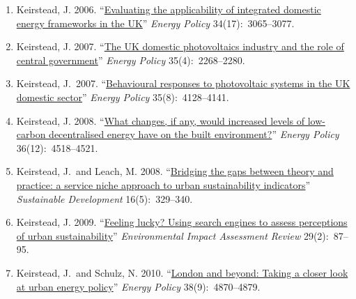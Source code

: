 \documentclass[11pt,a4paper]{article}
\newcommand{\marginhead}[1]{\marginpar{\textsf{{\footnotesize #1}}}}
\newcommand{\flag}{\marginpar{\hfill\raisebox{-2pt}{*}}}
\begin{document}
\bigskip 

\noindent\marginhead{Journal articles}%
%
%  
\mbox{}\vspace{-2em}
\begin{enumerate}

\item Keirstead, J. 2006. ``\href{http://dx.doi.org/10.1016/j.enpol.2005.06.004}{Evaluating the applicability of integrated domestic energy frameworks in the UK}'' \emph{Energy Policy} 34(17):~3065--3077.

\item Keirstead, J. 2007. ``\href{http://dx.doi.org/10.1016/j.enpol.2006.08.003}{The UK domestic photovoltaics industry and the role of central government}'' \emph{Energy Policy} 35(4):~2268--2280.

\item Keirstead, J.\flag\ 2007. ``\href{http://dx.doi.org/10.1016/j.enpol.2007.02.019}{Behavioural responses to photovoltaic systems in the UK domestic sector}'' \emph{Energy Policy} 35(8):~4128--4141.\label{paper:dphil}

\item Keirstead, J. 2008. ``\href{http://dx.doi.org/10.1016/j.enpol.2008.09.019}{What changes, if any, would increased levels of low-carbon decentralised energy have on the built environment?}'' \emph{Energy Policy} 36(12):~4518--4521.

\item Keirstead, J.\  and Leach, M.  2008. ``\href{http://dx.doi.org/10.1002/sd.349}{Bridging the gaps between theory and practice: a service niche approach to urban sustainability indicators}'' \emph{Sustainable Development} 16(5):~329--340.

\item Keirstead, J. 2009. ``\href{http://dx.doi.org/10.1016/j.eiar.2008.09.001}{Feeling lucky? Using search engines to assess perceptions of urban sustainability}'' \emph{Environmental Impact Assessment Review} 29(2):~87--95.

\item Keirstead, J.\  and Schulz, N. 2010. ``\href{http://dx.doi.org/10.1016/j.enpol.2009.07.025}{London and beyond: Taking a closer look at urban energy policy}'' \emph{Energy Policy} 38(9):~4870--4879.


\end{enumerate}
\end{document}
